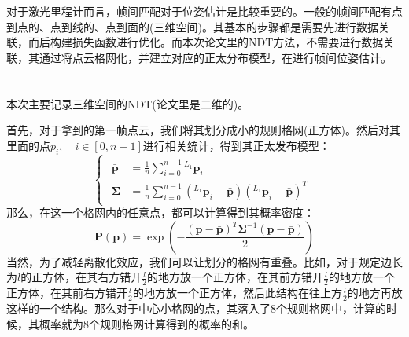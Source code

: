 \documentclass[12pt, twocolumn]{article}
\title{\normf{这是标题}}
\author{\normf{陈烁龙}}
\date{\normf{\today}}
\newcommand{\normf}{\kaishu}
\begin{document}
	
	\maketitle
	\thispagestyle{empty}
	\clearpage
	
	\tableofcontents
	\listoffigures
	\listoftables
	\setcounter{page}{1}
	\clearpage
	\setcounter{page}{1}
	
	\section{\normf{概述}}
	\normf
	对于激光里程计而言，帧间匹配对于位姿估计是比较重要的。一般的帧间匹配有点到点的、点到线的、点到面的(三维空间)。其基本的步骤都是需要先进行数据关联，而后构建损失函数进行优化。而本次论文里的NDT方法，不需要进行数据关联，其通过将点云格网化，并建立对应的正太分布模型，在进行帧间位姿估计。
	
	\section{\normf{论文算法}}
	本次主要记录三维空间的NDT(论文里是二维的)。
	
	首先，对于拿到的第一帧点云，我们将其划分成小的规则格网(正方体)。然后对其里面的点$p_i,\quad i\in[0,n-1]$进行相关统计，得到其正太发布模型：
	\begin{equation*}
		\begin{cases}
			\begin{aligned}
				\bar{\boldsymbol{p}}&=\frac{1}{n}\sum_{i=0}^{n-1}{^{L_1}\boldsymbol{p}_i}\\
				\boldsymbol{\Sigma}&=\frac{1}{n}\sum_{i=0}^{n-1}(^{L_1}\boldsymbol{p}_i-\bar{\boldsymbol{p}})(^{L_1}\boldsymbol{p}_i-\bar{\boldsymbol{p}})^T
			\end{aligned}
		\end{cases}
	\end{equation*}
	那么，在这一个格网内的任意点，都可以计算得到其概率密度：
	\begin{equation*}
		\boldsymbol{P}(\boldsymbol{p})=\exp\left(-\frac{\left(\boldsymbol{p}-\bar{\boldsymbol{p}}\right)^T\boldsymbol{\Sigma}^{-1}\left(\boldsymbol{p}-\bar{\boldsymbol{p}}\right)}{2}\right)
	\end{equation*}
	当然，为了减轻离散化效应，我们可以让划分的格网有重叠。比如，对于规定边长为$l$的正方体，在其右方错开$\frac{l}{2}$的地方放一个正方体，在其前方错开$\frac{l}{2}$的地方放一个正方体，在其前右方错开$\frac{l}{2}$的地方放一个正方体，然后此结构在往上方$\frac{l}{2}$的地方再放这样的一个结构。那么对于中心小格网的点，其落入了8个规则格网中，计算的时候，其概率就为8个规则格网计算得到的概率的和。
	
\end{document}
